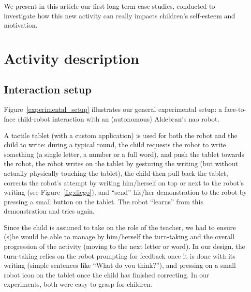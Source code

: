 \documentclass{sig-alternate}
\begin{document}
We present in this
article our first long-term case studies, conducted to investigate how this new activity
can really impacts children's self-esteem and motivation.    




\section{Activity description}
\subsection{Interaction setup}
Figure~\ref{experimental_setup} illustrates our general experimental setup: a
face-to-face child-robot interaction with an (autonomous) Aldebran's {\sc nao}
robot.

A tactile tablet (with a custom application) is used for both the robot and the
child to write: during a typical round, the child requests the robot to write
something (a single letter, a number or a full word), and push the tablet
towards the robot, the robot writes on the tablet by gesturing the writing (but
without actually physically touching the tablet), the child then pull back the
tablet, corrects the robot's attempt by writing him/herself on top or next to
the robot's writing (see Figure~\ref{fig:diego}), and ``send'' his/her
demonstration to the robot by pressing a small button on the tablet. The robot
``learns'' from this demonstration and tries again.

Since the child is assumed to take on the role of the teacher, we had to ensure
(s)he would be able to manage by him/herself the turn-taking and the overall
progression of the activity (moving to the next letter or word). In our design,
the turn-taking relies on the robot prompting for feedback once it is done with
its writing (simple sentences like ``What do you think?''), and pressing on a
small robot icon on the tablet once the child has finished correcting. In our
experiments, both were easy to grasp for children.
\end{document}
